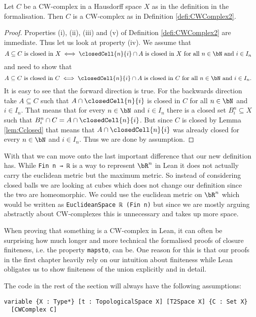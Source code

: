 \begin{lem}
  Let $C$ be a CW-complex in a Hausdorff space $X$ as in the definition in the formalisation.
  Then $C$ is a CW-complex as in Definition \ref{defi:CWComplex2}.
\end{lem}
\begin{proof}
  Properties (i), (ii), (iii) and (v) of Definition \ref{defi:CWComplex2} are immediate.
  Thus let us look at property (iv).
  We assume that
  \[A \subseteq C \text{ is closed in } X \iff \closedCell{n}{i} \cap A \text{ is closed in } X \text{ for all } n \in \bN \text{ and } i \in I_n\]
  and need to show that
  \[A \subseteq C \text{ is closed in } C \iff \closedCell{n}{i} \cap A \text{ is closed in } C \text{ for all } n \in \bN \text{ and } i \in I_n.\]
  It is easy to see that the forward direction is true.
  For the backwards direction take $A \subseteq C$ such that $A \cap \closedCell{n}{i}$ is closed in $C$ for all $n \in \bN$ and $i \in I_n$.
  That means that for every $n \in \bN$ and $i \in I_n$ there is a closed set $B_i^n \subseteq X$ such that $B^n_i \cap C = A \cap \closedCell{n}{i}$.
  But since $C$ is closed by Lemma \ref{lem:Cclosed} that means that $A \cap \closedCell{n}{i}$ was already closed for every $n \in \bN$ and $i \in I_n$.
  Thus we are done by assumption.
\end{proof}

With that we can move onto the last important difference that our new definition has.
While \lstinline{Fin n → ℝ} is a way to represent $\bR^n$ in Lean it does not actually carry the euclidean metric but the maximum metric.
So instead of considering closed balls we are looking at cubes which does not change our definition since the two are homeomorphic.
We could use the euclidean metric on $\bR^n$ which would be written as \lstinline{EuclideanSpace ℝ (Fin n)} but since we are mostly arguing abstractly about CW-complexes this is unnecessary and takes up more space.

When proving that something is a CW-complex in Lean, it can often be surprising how much longer and more technical the formalised proofs of closure finiteness, i.e. the property \lstinline{mapsto}, can be. 
One reason for this is that our proofs in the first chapter heavily rely on our intuition about finiteness while Lean obligates us to show finiteness of the union explicitly and in detail.

The code in the rest of the section will always have the following assumptions:

\begin{lstlisting}
variable {X : Type*} [t : TopologicalSpace X] [T2Space X] {C : Set X} 
  [CWComplex C]
\end{lstlisting}

